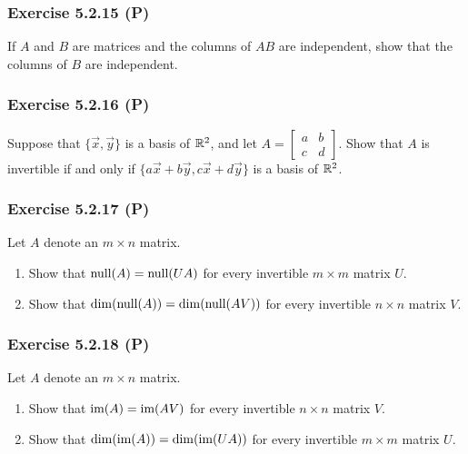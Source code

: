 \documentclass[pdf,9pt,t]{beamer}
\begin{document}
\begin{frame}[fragile]
    \frametitle{Exercise 5.2.15 (P)}
    \begin{problem}
	If $A$ and $B$ are matrices and the columns of $AB$ are independent, show that
	the columns of $B$ are independent.
    \end{problem}

\end{frame}
\begin{frame}[fragile]
    \frametitle{Exercise 5.2.16 (P)}
    \begin{problem}
	Suppose that $\{\vec{x},\vec{y}\}$ is a basis of $\mathbb{R}^2$, and let $A=\begin{bmatrix} a&b\\ c&d \end{bmatrix} $.
	Show that $A$ is invertible if and only if $\{a \vec{x}+b \vec{y}, c \vec{x} + d \vec{y}\}$ is a basis of $\mathbb{R}^2$.
    \end{problem}

\end{frame}
\begin{frame}[fragile]
    \frametitle{Exercise 5.2.17 (P)}
    \begin{problem}
	Let $A$ denote an $m\times n$ matrix.
	\begin{enumerate}
	    \item Show that $\mbox{null}(A)=\mbox{null}(U A)$ for every invertible $m\times m$ matrix $U$.
	    \item Show that $\dim(\mbox{null}(A)) = \dim(\mbox{null}(AV))$ for every invertible $n\times n$ matrix $V$.
	\end{enumerate}
    \end{problem}

\end{frame}
\begin{frame}[fragile]
    \frametitle{Exercise 5.2.18 (P)}
    \begin{problem}
	Let $A$ denote an $m\times n$ matrix.
	\begin{enumerate}
	    \item Show that $\mbox{im}(A)=\mbox{im}(AV)$ for every invertible $n\times n$ matrix $V$.
	    \item Show that $\dim(\mbox{im}(A)) = \dim(\mbox{im}(U A))$ for every invertible $m\times m$ matrix $U$.
	\end{enumerate}
    \end{problem}

\end{frame}
\end{document}
